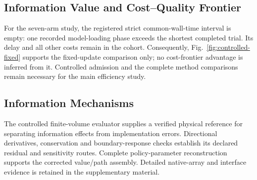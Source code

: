 \subsection{Information Value and Cost--Quality Frontier}
For the seven-arm study, the registered strict common-wall-time interval is empty: one recorded model-loading phase exceeds the shortest completed trial. Its delay and all other costs remain in the cohort. Consequently, Fig.~\ref{fig:controlled-fixed} supports the fixed-update comparison only; no cost-frontier advantage is inferred from it. Controlled admission and the complete method comparisons remain necessary for the main efficiency study.

\subsection{Information Mechanisms}
The controlled finite-volume evaluator supplies a verified physical reference for separating information effects from implementation errors. Directional derivatives, conservation and boundary-response checks establish its declared residual and sensitivity routes. Complete policy-parameter reconstruction supports the corrected value/path assembly. Detailed native-array and interface evidence is retained in the supplementary material.

